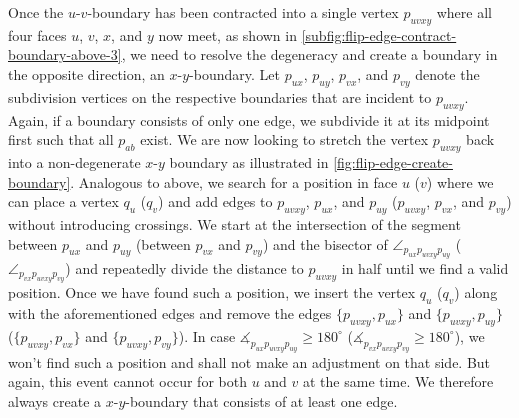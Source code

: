 Once the $u$-$v$-boundary has been contracted into a single vertex $p_{uvxy}$ where all four faces $u$, $v$, $x$, and $y$ now meet, as shown in \cref{subfig:flip-edge-contract-boundary-above-3}, we need to resolve the degeneracy and create a boundary in the opposite direction, \ie{} an $x$-$y$-boundary.
Let $p_{ux}$, $p_{uy}$, $p_{vx}$, and $p_{vy}$ denote the subdivision vertices on the respective boundaries that are incident to $p_{uvxy}$. Again, if a boundary consists of only one edge, we subdivide it at its midpoint first such that all $p_{ab}$ exist.
We are now looking to stretch the vertex $p_{uvxy}$ back into a non-degenerate $x$-$y$ boundary as illustrated in \cref{fig:flip-edge-create-boundary}. Analogous to above, we search for a position in face $u$ ($v$) where we can place a vertex $q_u$ ($q_v$) and add edges to $p_{uvxy}$, $p_{ux}$, and $p_{uy}$ ($p_{uvxy}$, $p_{vx}$, and $p_{vy}$) without introducing crossings. We start at the intersection of the segment between $p_{ux}$ and $p_{uy}$ (between $p_{vx}$ and $p_{vy}$) and the bisector of $\angle_{p_{ux}p_{uvxy}p_{uy}}$ ($\angle_{p_{vx}p_{uvxy}p_{vy}}$) and repeatedly divide the distance to $p_{uvxy}$ in half until we find a valid position. Once we have found such a position, we insert the vertex $q_u$ ($q_v$) along with the aforementioned edges and remove the edges $\{p_{uvxy},p_{ux}\}$ and $\{p_{uvxy},p_{uy}\}$ ($\{p_{uvxy},p_{vx}\}$ and $\{p_{uvxy},p_{vy}\}$). In case $\measuredangle_{p_{ux}p_{uvxy}p_{uy}} \geq 180^\circ$ ($\measuredangle_{p_{vx}p_{uvxy}p_{vy}} \geq 180^\circ$), we won't find such a position and shall not make an adjustment on that side. But again, this event cannot occur for both $u$ and $v$ at the same time. We therefore always create a $x$-$y$-boundary that consists of at least one edge.

